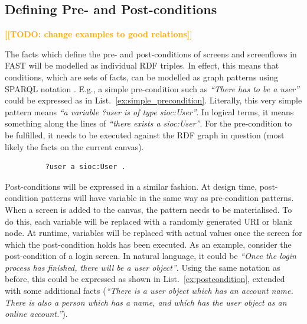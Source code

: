 \documentclass[twoside]{fast_latex}
\newcommand{\todo}[1]{\textsf{\textbf{\textcolor{Orange}{[[TODO: #1]]}}}}
\newcommand{\todo}[1]{}
\begin{document}

\subsection{Defining Pre- and Post-conditions} %
\label{sub:defining_pre_and_post_conditions}

\todo{change examples to good relations}

The facts which define the pre- and post-conditions of screens and screenflows in FAST will be modelled as individual RDF triples. In effect, this means that conditions, which are sets of facts, can be modelled as graph patterns using SPARQL notation \cite{sparql2008spec}. E.g., a simple pre-condition such as \emph{``There has to be a user''} could be expressed as in List.~\ref{ex:simple_precondition}. Literally, this very simple pattern means \emph{``a variable ?user is of type sioc:User''}. In logical terms, it means something along the lines of \emph{``there exists a sioc:User''}. For the pre-condition to be fulfilled, it needs to be executed against the RDF graph in question (most likely the facts on the current canvas).

\singlespacing
{}
\begin{figure}[ht]
\begin{lstlisting}
	?user a sioc:User .
\end{lstlisting}
\end{figure}
\doublespacing

Post-conditions will be expressed in a similar fashion. At design time, post-condition patterns will have variable in the same way as pre-condition patterns. When a screen is added to the canvas, the pattern needs to be materialised. To do this, each variable will be replaced with a randomly generated URI or blank node. At runtime, variables will be replaced with actual values once the screen for which the post-condition holds has been executed. As an example, consider the post-condition of a login screen. In natural language, it could be \emph{``Once the login process has finished, there will be a user object''}. Using the same notation as before, this could be expressed as shown in List.~\ref{ex:postcondition}, extended with some additional facts (\emph{``There is a user object which has an account name. There is also a person which has a name, and which has the user object as an online account.''}).
\end{document}
